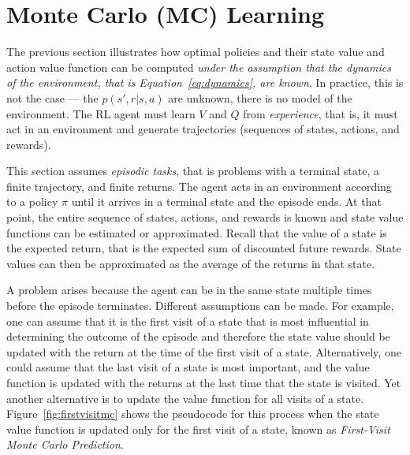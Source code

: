 \section{Monte Carlo (MC) Learning}

The previous section illustrates how optimal policies and their state value and action value function can be computed \emph{under the assumption that the dynamics of the environment, that is Equation~\ref{eq:dynamics}, are known}. In practice, this is not the case --- the $p(s', r | s, a)$ are unknown, there is no model of the environment. The RL agent must learn $V$ and $Q$ from \emph{experience}, that is, it must act in an environment and generate trajectories (sequences of states, actions, and rewards). 

This section assumes \emph{episodic tasks}, that is problems with a terminal state, a finite trajectory, and finite returns. The agent acts in an environment according to a policy $\pi$ until it arrives in a terminal state and the episode ends. At that point, the entire sequence of states, actions, and rewards is known and state value functions can be estimated or approximated. Recall that the value of a state is the expected return, that is the expected sum of discounted future rewards. State values can then be approximated as the average of the returns in that state. 

A problem arises because the agent can be in the same state multiple times before the episode terminates. Different assumptions can be made. For example, one can assume that it is the first visit of a state that is most influential in determining the outcome of the episode and therefore the state value should be updated with the return at the time of the first visit of a state. Alternatively, one could assume that the last visit of a state is most important, and the value function is updated with the returns at the last time that the state is visited. Yet another alternative is to update the value function for all visits of a state. Figure~\ref{fig:firstvisitmc} shows the pseudocode for this process when the state value function is updated only for the first visit of a state, known as \emph{First-Visit Monte Carlo Prediction}.

